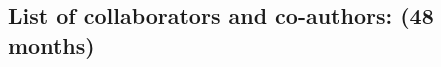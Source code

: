 \documentclass[letterpaper,oneside,11pt]{article}
\begin{document}
\begin{comment}
\begin{wrapfigure}[18]{r}{.6\linewidth}
\vspace{-1\baselineskip}
\centerline{
\texttt{[image: plotting.both.eps]}
\texttt{[image: sorted.lower.fixed.upper.eps]}
}
\caption{\label{mlsorted}(left) Using machine learning to identify subtle features in 
(right) An example of sorting molecular Auger electron spectra based on CNN predicted FEL two-color spectrum from XTCAV. }
\end{wrapfigure}
\end{comment}

\subsection*{List of collaborators and co-authors: (48 months)}
\end{document}

